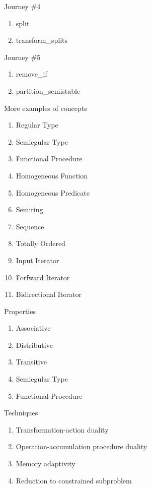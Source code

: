 \documentclass[10pt]{beamer}
\begin{document}
\begin{frame}{Journey \#4}
    \begin{enumerate}
        \item split
        \item transform\_splits
    \end{enumerate}
\end{frame}

\begin{frame}{Journey \#5}
    \begin{enumerate}
        \item remove\_if
        \item partition\_semistable
    \end{enumerate}
\end{frame}


\begin{frame}{More examples of concepts}
\begin{enumerate}
  \item Regular Type
  \item Semiegular Type
  \item Functional Procedure
  \item Homogeneous Function
  \item Homogeneous Predicate
  \item Semiring
  \item Sequence
  \item Totally Ordered
  \item Input Iterator
  \item Forfward Iterator
  \item Bidirectional Iterator
\end{enumerate}
\end{frame}

\begin{frame}{Properties}
\begin{enumerate}
  \item Associative
  \item Distributive
  \item Transitive
  \item Semiegular Type
  \item Functional Procedure
\end{enumerate}
\end{frame}

\begin{frame}{Techniques}
\begin{enumerate}
  \item Transformation-action duality
  \item Operation-accumulation procedure duality
  \item Memory adaptivity
  \item Reduction to constrained subproblem 
\end{enumerate}
\end{frame}
\end{document}
